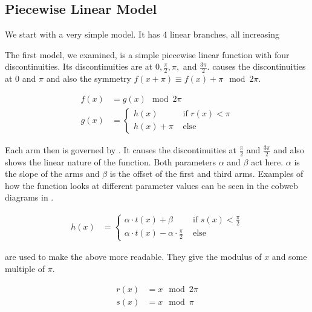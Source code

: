 \subsection{Piecewise Linear Model}

We start with a very simple model.
It has 4 linear branches, all increasing

The first model, we examined, is a simple piecewise linear function with four discontinuities.
Its discontinuities are at $0, \frac{\pi}{2}, \pi,$ and $\frac{3 \pi}{2}$.
 causes the discontinuities at $0$ and $\pi$ and also the symmetry $f(x + \pi) \equiv f(x) + \pi \mod 2 \pi$.

\begin{align}
	f(x) & = g(x) \mod 2 \pi \label{equ:pcw.lin.f} \\
	g(x) & = \begin{cases}
		         h(x)       & \text{ if } r(x) < \pi \\
		         h(x) + \pi & \text{ else}
	         \end{cases} \label{equ:pcw.lin.sympi}
\end{align}

Each arm then is governed by .
It causes the discontinuities at $\frac{\pi}{2}$ and $\frac{3 \pi}{2}$ and also shows the linear nature of the function.
Both parameters $\alpha$ and $\beta$ act here.
$\alpha$ is the slope of the arms and $\beta$ is the offset of the first and third arms.
Examples of how the function looks at different parameter values can be seen in the cobweb diagrams in .

\begin{align}
	h(x) & = \begin{cases}
		         \alpha \cdot t(x) + \beta                      & \text{ if } s(x) < \frac{\pi}{2} \\
		         \alpha \cdot t(x) - \alpha \cdot \frac{\pi}{2} & \text{ else}
	         \end{cases} \label{equ:pcw.lin.discpihalves}
\end{align}

 are used to make the above more readable.
They give the modulus of $x$ and some multiple of $\pi$.

\begin{align}
	r(x) & = x \mod 2 \pi \label{equ:pcw.lin.r} \\
	s(x) & = x \mod \pi \label{equ:pcw.lin.s}
\end{align}





